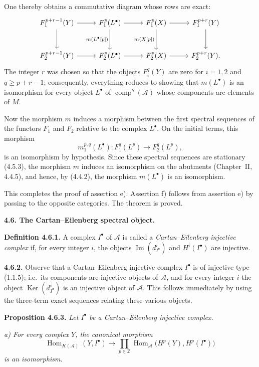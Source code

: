 \clearpage
{}%
\begingroup\small\setlength{\parskip}{0pt}\setlength{\emergencystretch}{1.5em}
\setlength{\abovedisplayskip}{4pt plus 2pt minus 2pt}%
\setlength{\belowdisplayskip}{4pt plus 2pt minus 2pt}%

One thereby obtains a commutative diagram whose rows are exact:
\[
\begin{tikzcd}[column sep=2.7em,row sep=2.8em]
F_1^{p+r-1}(Y) \arrow[r] \arrow[d] &
F_1^p(L^\bullet) \arrow[r] \arrow[d,"{m(L^\bullet[p])}"'] &
F_1^p(X) \arrow[r] \arrow[d,"{m(X[p])}"'] &
F_1^{p+r}(Y) \arrow[d] \\
F_2^{p+r-1}(Y) \arrow[r] &
F_2^p(L^\bullet) \arrow[r] &
F_2^p(X) \arrow[r] &
F_2^{p+r}(Y).
\end{tikzcd}
\]
The integer $r$ was chosen so that the objects $F_i^q(Y)$ are zero for
$i=1,2$ and $q\geq p+r-1$; consequently, everything reduces to showing
that $m(L^\bullet)$ is an isomorphism for every object $L^\bullet$ of
$\operatorname{comp}^{b}(\mathcal A)$ whose components are elements of
$M$.

Now the morphism $m$ induces a morphism between the first spectral
sequences of the functors $F_1$ and $F_2$ relative to the complex
$L^\bullet$. On the initial terms, this morphism
\[
m_1^{p,q}(L^\bullet)\colon F_1^q(L^p)\longrightarrow F_2^q(L^p),
\]
is an isomorphism by hypothesis. Since these spectral sequences are
stationary (4.5.3), the morphism $m$ induces an isomorphism on the abutments
(Chapter~II, 4.4.5), and hence, by (4.4.2), the morphism $m(L^\bullet)$ is
an isomorphism.

This completes the proof of assertion e). Assertion f) follows from
assertion e) by passing to the opposite categories. The theorem is proved.

\medskip\noindent\textbf{4.6. The Cartan--Eilenberg spectral object.}

\noindent\textbf{Definition 4.6.1.}\quad
A complex $I^\bullet$ of $\mathcal A$ is called a \emph{Cartan--Eilenberg
injective complex} if, for every integer $i$, the objects
$\operatorname{Im}(d_{I^\bullet}^{i})$ and $H^i(I^\bullet)$ are injective.

\noindent\textbf{4.6.2.}\quad
Observe that a Cartan--Eilenberg injective complex $I^\bullet$ is of
injective type (1.1.5); i.e.\ its components are injective objects of
$\mathcal A$, and for every integer $i$ the object
$\operatorname{Ker}(d_{I^\bullet}^{i})$ is an injective object of
$\mathcal A$. This follows immediately by using the three-term exact
sequences relating these various objects.

\medskip\noindent\textbf{Proposition 4.6.3.}\quad
\textit{Let $I^\bullet$ be a Cartan--Eilenberg injective complex.}

\noindent\textit{a) For every complex $Y$, the canonical morphism}
\[
\operatorname{Hom}_{K(\mathcal A)}(Y,I^\bullet)
\longrightarrow
\prod_{p\in\mathbb Z}
\operatorname{Hom}_{\mathcal A}\bigl(H^p(Y),H^p(I^\bullet)\bigr)
\]
\textit{is an isomorphism.}
\endgroup
